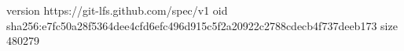 version https://git-lfs.github.com/spec/v1
oid sha256:e7fc50a28f5364dee4cfd6efc496d915c5f2a20922c2788cdecb4f737deeb173
size 480279
